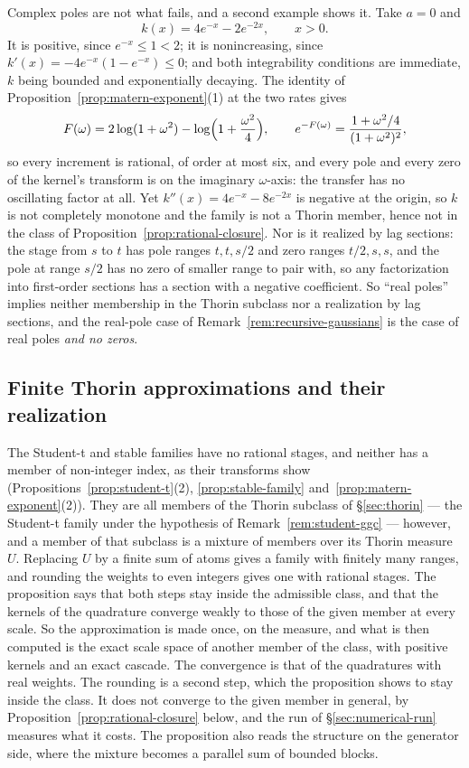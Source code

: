 \begin{remark}
Complex poles are not what fails, and a second example shows it. Take $a = 0$ and
\[
  k(x) = 4e^{-x} - 2e^{-2x}, \qquad x > 0 .
\]
It is positive, since $e^{-x} \le 1 < 2$; it is nonincreasing, since
$k'(x) = -4e^{-x}(1 - e^{-x}) \le 0$; and both integrability conditions are immediate, $k$ being
bounded and exponentially decaying. The identity of Proposition~\ref{prop:matern-exponent}(1) at
the two rates gives
\[
  F(\omega) = 2\log(1 + \omega^2) - \log\Bigl(1 + \frac{\omega^2}{4}\Bigr),
  \qquad
  e^{-F(\omega)} = \frac{1 + \omega^2/4}{(1+\omega^2)^2},
\]
so every increment is rational, of order at most six, and every pole and every zero of the
kernel's transform is on the imaginary $\omega$-axis: the transfer has no oscillating factor at
all. Yet $k''(x) = 4e^{-x} - 8e^{-2x}$ is negative at the origin, so $k$ is not completely
monotone and the family is not a Thorin member, hence not in the class of
Proposition~\ref{prop:rational-closure}. Nor is it realized by lag sections: the stage from $s$ to
$t$ has pole ranges $t, t, s/2$ and zero ranges $t/2, s, s$, and the pole at range $s/2$ has no
zero of smaller range to pair with, so any factorization into first-order sections has a section
with a negative coefficient. So ``real poles'' implies neither membership in the Thorin subclass
nor a realization by lag sections, and the real-pole case of
Remark~\ref{rem:recursive-gaussians} is the case of real poles \emph{and no zeros}.
\end{remark}

\subsection{Finite Thorin approximations and their realization}\label{sec:thorin-machine}

The Student-t and stable families have no rational stages, and neither has a \Matern{} member
of non-integer index, as their transforms show (Propositions~\ref{prop:student-t}(2),
\ref{prop:stable-family} and~\ref{prop:matern-exponent}(2)). They are all members of the
Thorin subclass of \S\ref{sec:thorin} --- the Student-t family under the hypothesis of
Remark~\ref{rem:student-ggc} ---
however, and a member of that subclass is a mixture of \Matern{} members over its Thorin
measure $U$. Replacing $U$ by a finite sum of atoms gives a family with finitely many ranges,
and rounding the weights to even integers gives one with rational stages. The proposition
says that both steps stay inside the admissible class, and that the kernels of the quadrature
converge weakly to those of the given member at every scale. So the approximation is made
once, on the measure, and what is then computed is the exact scale space of another member of
the class, with positive kernels and an exact cascade. The convergence is that of the
quadratures with real weights. The rounding is a second step, which the proposition shows to
stay inside the class. It does not converge to the given member in general, by
Proposition~\ref{prop:rational-closure} below, and the run of \S\ref{sec:numerical-run}
measures what it costs. The proposition also reads the
structure on the generator side, where the mixture becomes a parallel sum of bounded blocks.

